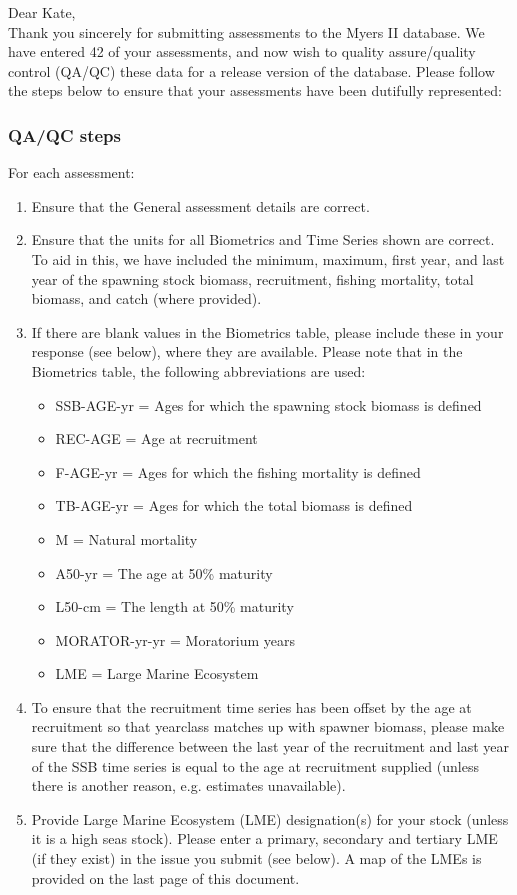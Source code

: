 \documentclass [a4paper, 10pt] {article}
\begin{document}
\noindent Dear Kate,\\

\noindent Thank you sincerely for submitting assessments to the Myers II database. We have entered 42 of your assessments, and now wish to quality assure/quality control (QA/QC) these data for a release version of the database. Please follow the steps below to ensure that your assessments have been dutifully represented:
\subsubsection{QA/QC steps}
For each assessment:
\begin{enumerate}
\item Ensure that the General assessment details are correct.
\item Ensure that the units for all Biometrics and Time Series shown are correct. To aid in this, we have included the minimum, maximum, first year, and last year of the spawning stock biomass, recruitment, fishing mortality, total biomass, and  catch  (where provided). 
\item If there are blank values in the Biometrics table, please include these in your response (see below), where they are available.
Please note that in the Biometrics table, the following abbreviations are used:
\begin{itemize}
\item SSB-AGE-yr  = Ages for which the spawning stock biomass is defined
\item REC-AGE     = Age at recruitment
\item F-AGE-yr    = Ages for which the fishing mortality is defined 
\item TB-AGE-yr   = Ages for which the total biomass is defined
\item M      = Natural mortality
\item A50-yr      = The age at 50\% maturity
\item L50-cm      = The length at 50\% maturity
\item MORATOR-yr-yr = Moratorium years
\item LME = Large Marine Ecosystem\\
\end{itemize}
\item To ensure that the recruitment time series has been offset by the age at recruitment so that yearclass matches up with spawner biomass, please make sure that the difference between the last year of the recruitment and last year of the SSB time series is equal to the age at recruitment supplied (unless there is another reason, e.g. estimates unavailable). 
\item Provide Large Marine Ecosystem (LME) designation(s) for your stock (unless it is a high seas stock). Please enter a primary, secondary and tertiary LME (if they exist) in the issue you submit (see below). A map of the LMEs is provided on the last page of this document. 
\end{enumerate}
\vspace{-.25in}
\end{document}
